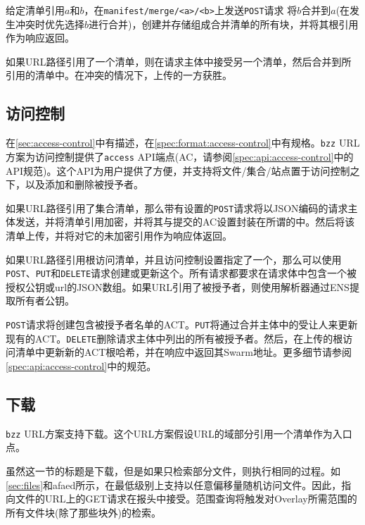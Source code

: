 给定清单引用$a$和$b$，在\lstinline{manifest/merge/<a>/<b>}上发送\lstinline{POST}请求
将$b$合并到$a$(在发生冲突时优先选择$b$进行合并)，创建并存储组成合并清单的所有块，并将其根引用作为响应返回。


如果URL路径引用了一个清单，则在请求主体中接受另一个清单，然后合并到所引用的清单中。在冲突的情况下，上传的一方获胜。 


\subsection{访问控制\statusgreen}\label{sec:access-control-ux}

在\ref{sec:access-control}中有描述，在\ref{spec:format:access-control}中有规格。\lstinline{bzz} URL方案为访问控制提供了\lstinline{access} API端点(AC，请参阅\ref{spec:api:access-control}中的API规范)。这个API为用户提供了方便，并支持将文件/集合/站点置于访问控制之下，以及添加和删除被授予者。

如果URL路径引用了集合清单，那么带有设置的\lstinline{POST}请求将以JSON编码的请求主体发送，并将清单引用加密，并将其与提交的AC设置封装在所谓的中。然后将该清单上传，并将对它的未加密引用作为响应体返回。

如果URL路径引用根访问清单，并且访问控制设置指定了一个，那么可以使用\lstinline{POST}、\lstinline{PUT}和\lstinline{DELETE}请求创建或更新这个。所有请求都要求在请求体中包含一个被授权公钥或url的JSON数组。如果URL引用了被授予者，则使用解析器通过ENS提取所有者公钥。

\lstinline{POST}请求将创建包含被授予者名单的ACT。\lstinline{PUT}将通过合并主体中的受让人来更新现有的ACT。\lstinline{DELETE}删除请求主体中列出的所有被授予者。然后，在上传的根访问清单中更新新的ACT根哈希，并在响应中返回其Swarm地址。更多细节请参阅\ref{spec:api:access-control}中的规范。



\subsection{下载\statusgreen}\label{sec:download}

\lstinline{bzz} URL方案支持下载。这个URL方案假设URL的域部分引用一个清单作为入口点。

虽然这一节的标题是下载，但是如果只检索部分文件，则执行相同的过程。如\ref{sec:files}和afaed所示，在最低级别上支持以任意偏移量随机访问文件。因此，指向文件的URL上的GET请求在报头中接受。范围查询将触发对Overlay所需范围的所有文件块(除了那些块外)的检索。  

